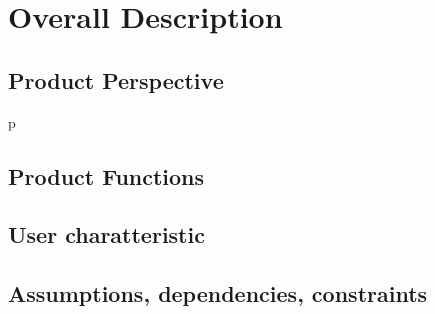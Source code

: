 \chapter{Overall Description}

\section{Product Perspective}
p
\section{Product Functions}
\section{User charatteristic}
\section{Assumptions, dependencies, constraints}